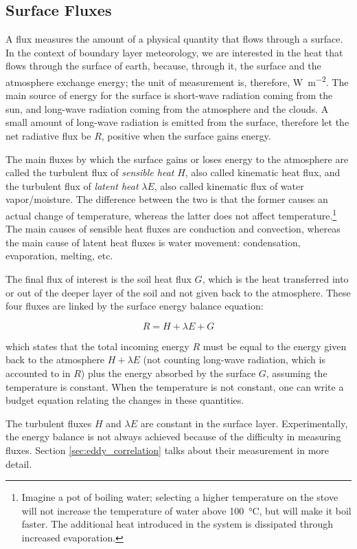 \documentclass[a4paper,11pt]{kth-mag}
\begin{document}
\subsection{Surface Fluxes}
\label{sec:surface_fluxes}
A flux measures the amount of a physical quantity that flows through a surface. In the context of boundary layer meteorology, we are interested in the heat that flows through the surface of earth, because, through it, the surface and the atmosphere exchange energy; the unit of measurement is, therefore, \si{\watt\per\square\meter}. The main source of energy for the surface is short-wave radiation coming from the sun, and long-wave radiation coming from the atmosphere and the clouds. A small amount of long-wave radiation is emitted from the surface, therefore let the net radiative flux be $R$, positive when the surface gains energy.

The main fluxes by which the surface gains or loses energy to the atmosphere are called the turbulent flux of \emph{sensible heat} $H$, also called kinematic heat flux, and the turbulent flux of \emph{latent heat} $\lambda E$, also called kinematic flux of water vapor/moisture. The difference between the two is that the former causes an actual change of temperature, whereas the latter does not affect temperature.\footnote{Imagine a pot of boiling water; selecting a higher temperature on the stove will not increase the temperature of water above \SI{100}{\celsius}, but will make it boil faster. The additional heat introduced in the system is dissipated through increased evaporation.} The main causes of sensible heat fluxes are conduction and convection, whereas the main cause of latent heat fluxes is water movement: condensation, evaporation, melting, etc. 

The final flux of interest is the soil heat flux $G$, which is the heat transferred into or out of the deeper layer of the soil and not given back to the atmosphere. These four fluxes are linked by the surface energy balance equation:

$$
R=H+\lambda E+G
$$

\noindent which states that the total incoming energy $R$ must be equal to the energy given back to the atmosphere $H+\lambda E$ (not counting long-wave radiation, which is accounted to in $R$) plus the energy absorbed by the surface $G$, assuming the temperature is constant. When the temperature is not constant, one can write a budget equation relating the changes in these quantities.

The turbulent fluxes $H$ and $\lambda E$ are constant in the surface layer. Experimentally, the energy balance is not always achieved \citep{cabauwinsitu} because of the difficulty in measuring fluxes. Section \ref{sec:eddy_correlation} talks about their measurement in more detail.
\end{document}

